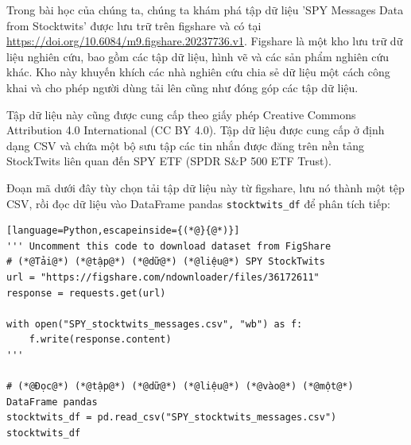 Trong bài học của chúng ta, chúng ta khám phá tập dữ liệu 'SPY Messages Data from Stocktwits' được lưu trữ trên figshare và có tại \url{https://doi.org/10.6084/m9.figshare.20237736.v1}. Figshare là một kho lưu trữ dữ liệu nghiên cứu, bao gồm các tập dữ liệu, hình vẽ và các sản phẩm nghiên cứu khác. Kho này khuyến khích các nhà nghiên cứu chia sẻ dữ liệu một cách công khai và cho phép người dùng tải lên cũng như đóng góp các tập dữ liệu.

Tập dữ liệu này cũng được cung cấp theo giấy phép Creative Commons Attribution 4.0 International (CC BY 4.0). Tập dữ liệu được cung cấp ở định dạng CSV và chứa một bộ sưu tập các tin nhắn được đăng trên nền tảng StockTwits liên quan đến SPY ETF (SPDR S\&P 500 ETF Trust).

Đoạn mã dưới đây tùy chọn tải tập dữ liệu này từ figshare, lưu nó thành một tệp CSV, rồi đọc dữ liệu vào DataFrame pandas \texttt{stocktwits\_df} để phân tích tiếp:

\begin{lstlisting}[language=Python,escapeinside={(*@}{@*)}]
''' Uncomment this code to download dataset from FigShare
# (*@Tải@*) (*@tập@*) (*@dữ@*) (*@liệu@*) SPY StockTwits
url = "https://figshare.com/ndownloader/files/36172611"
response = requests.get(url)

with open("SPY_stocktwits_messages.csv", "wb") as f:
    f.write(response.content)
'''

# (*@Đọc@*) (*@tập@*) (*@dữ@*) (*@liệu@*) (*@vào@*) (*@một@*) DataFrame pandas
stocktwits_df = pd.read_csv("SPY_stocktwits_messages.csv")
stocktwits_df
\end{lstlisting}

